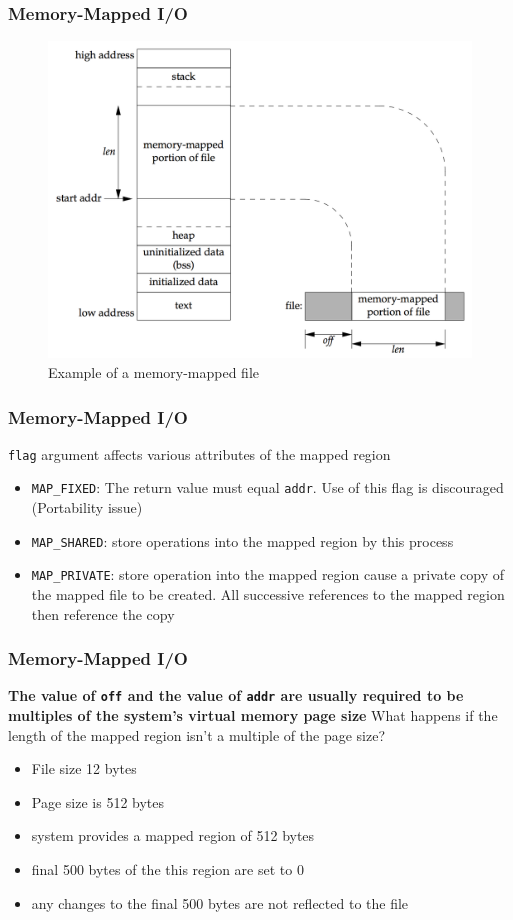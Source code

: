 \documentclass[newPxFont,sthlmFooter,nooffset]{beamer}
\begin{document}
\begin{frame}[t]
  \frametitle{Memory-Mapped I/O}
\begin{figure}[h]
  \includegraphics[width=0.8\linewidth]{figures/fig14_26-mmap.png}
  \caption{Example of a memory-mapped file}
\end{figure}

\end{frame}

\begin{frame}[t]
  \frametitle{Memory-Mapped I/O}
\texttt{flag} argument affects various attributes of the mapped region
\begin{itemize}
\item \texttt{MAP\_FIXED}: The return value must equal \texttt{addr}. Use of this flag is discouraged (Portability issue)
\item \texttt{MAP\_SHARED}: store operations into the mapped region by this process
\item \texttt{MAP\_PRIVATE}: store operation into the mapped region cause a private copy of the mapped file to be created. All successive references to the mapped region then reference the copy
\end{itemize}

\end{frame}

\begin{frame}[t]
  \frametitle{Memory-Mapped I/O}
\textbf{The value of \texttt{off} and the value of \texttt{addr} are usually required to be multiples of the system's virtual memory page size}
\bigskip
  What happens if the length of the mapped region isn't a multiple of the page size?
  \begin{itemize}
  \item File size 12 bytes
  \item Page size is 512 bytes
  \item system provides a mapped region of 512 bytes
  \item final 500 bytes of the this region are set to 0
  \item any changes to the final 500 bytes are not reflected to the file
  \end{itemize}
\end{frame}
\end{document}
